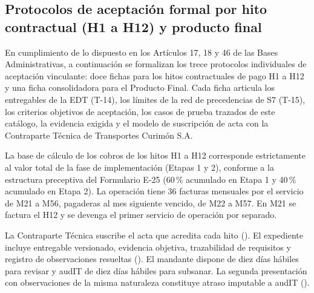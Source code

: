 
\subsection*{Protocolos de aceptación formal por hito contractual (H1 a H12) y producto final}\label{sec:9-protocolos-hitos}

En cumplimiento de lo dispuesto en los Artículos 17, 18 y 46 de las Bases Administrativas, a continuación se formalizan los trece protocolos individuales de aceptación vinculante: doce fichas para los hitos contractuales de pago H1 a H12 y una ficha consolidadora para el Producto Final. Cada ficha articula los entregables de la EDT (T-14), los límites de la red de precedencias de S7 (T-15), los criterios objetivos de aceptación, los casos de prueba trazados de este catálogo, la evidencia exigida y el modelo de suscripción de acta con la Contraparte Técnica de Transportes Curimón S.A.

La base de cálculo de los cobros de los hitos H1 a H12 corresponde estrictamente al valor total de la fase de implementación (Etapas 1 y 2), conforme a la estructura preceptiva del Formulario E-25 (60\,\% acumulado en Etapa 1 y 40\,\% acumulado en Etapa 2). La operación tiene 36 facturas mensuales por el servicio de M21 a M56, pagaderas al mes siguiente vencido, de M22 a M57. En M21 se factura el H12 y se devenga el primer servicio de operación por separado.

La Contraparte Técnica suscribe el acta que acredita cada hito (). El expediente incluye entregable versionado, evidencia objetiva, trazabilidad de requisitos y registro de observaciones resueltas (). El mandante dispone de diez días hábiles para revisar y audIT de diez días hábiles para subsanar. La segunda presentación con observaciones de la misma naturaleza constituye atraso imputable a audIT ().

